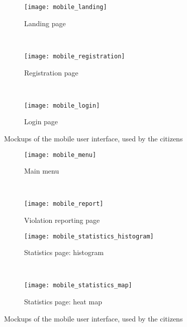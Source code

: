 \begin{figure}[h]
    \centering
    \begin{subfigure}{0.3\textwidth}
        \texttt{[image: mobile\_landing]}
        \caption{Landing page}
    \end{subfigure}
    ~
    \begin{subfigure}{0.3\textwidth}
        \texttt{[image: mobile\_registration]}
        \caption{Registration page}
    \end{subfigure}
    ~
    \begin{subfigure}{0.3\textwidth}
        \texttt{[image: mobile\_login]}
        \caption{Login page}
    \end{subfigure}

    \caption{Mockups of the mobile user interface, used by the citizens}
    \label{fig:mockups_mobile}
\end{figure}%
\begin{figure}[t]\ContinuedFloat
    \centering
    \begin{subfigure}{0.3\textwidth}
        \texttt{[image: mobile\_menu]}
        \caption{Main menu}
    \end{subfigure}
    ~
    \begin{subfigure}{0.3\textwidth}
        \texttt{[image: mobile\_report]}
        \caption{Violation reporting page}
    \end{subfigure}

    \begin{subfigure}{0.3\textwidth}
        \texttt{[image: mobile\_statistics\_histogram]}
        \caption{Statistics page: histogram}
    \end{subfigure}
    ~
    \begin{subfigure}{0.3\textwidth}
        \texttt{[image: mobile\_statistics\_map]}
        \caption{Statistics page: heat map}
    \end{subfigure}
    
    \caption{Mockups of the mobile user interface, used by the citizens}
\end{figure}

